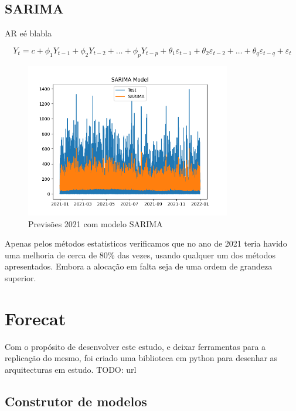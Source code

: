 \subsection{SARIMA}

AR eé blabla

\begin{equation} \label{eq:SARIMA} Y_t = c + \phi_1 Y_{t-1} + \phi_2 Y_{t-2} + \dots + \phi_p Y_{t-p} + \theta_1 \varepsilon_{t-1} + \theta_2 \varepsilon_{t-2} + \dots + \theta_q \varepsilon_{t-q} + \varepsilon_t \end{equation}

\begin{figure}[H]
    \centering
    \includegraphics[width=0.8\textwidth]{../plots/SARIMA_model.png}
    \caption{Previsões 2021 com modelo SARIMA}
    \label{fig:SARIMA_model}
\end{figure}

\resizebox{\linewidth}{!}{} %


Apenas pelos métodos estatisticos verificamos que no ano de 2021 teria havido uma melhoria de cerca de 80\% das vezes, usando qualquer um dos métodos apresentados.
Embora a alocação em falta seja de uma ordem de grandeza superior.


\section{Forecat  \label{se:forecat}}


Com o propósito de desenvolver este estudo, e deixar ferramentas para a replicação do mesmo, foi criado uma biblioteca em python para desenhar as arquitecturas em estudo.
TODO: url

\subsection{Construtor de modelos}

